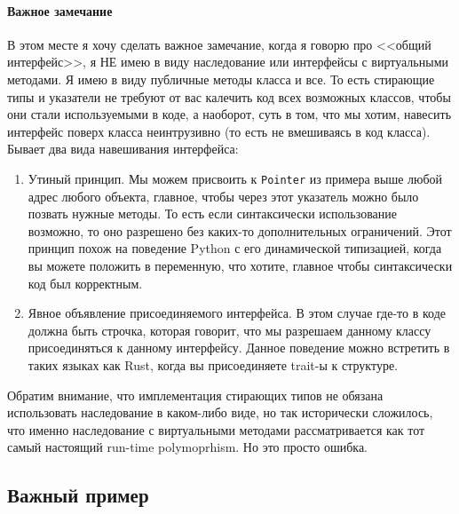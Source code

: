 \paragraph{Важное замечание}

В этом месте я хочу сделать важное замечание, когда я говорю про <<общий интерфейс>>, я НЕ имею в виду наследование или интерфейсы с виртуальными методами.
Я имею в виду публичные методы класса и все.
То есть стирающие типы и указатели не требуют от вас калечить код всех возможных классов, чтобы они стали используемыми в коде, а наоборот, суть в том, что мы хотим, навесить интерфейс поверх класса неинтрузивно (то есть не вмешиваясь в код класса).
Бывает два вида навешивания интерфейса:
\begin{enumerate}
\item Утиный принцип.
Мы можем присвоить к \texttt{Pointer} из примера выше любой адрес любого объекта, главное, чтобы через этот указатель можно было позвать нужные методы.
То есть если синтаксически использование возможно, то оно разрешено без каких-то дополнительных ограничений.
Этот принцип похож на поведение Python с его динамической типизацией, когда вы можете положить в переменную, что хотите, главное чтобы синтаксически код был корректным.

\item Явное объявление присоединяемого интерфейса.
В этом случае где-то в коде должна быть строчка, которая говорит, что мы разрешаем данному классу присоединяться к данному интерфейсу.
Данное поведение можно встретить в таких языках как Rust, когда вы присоединяете trait-ы к структуре.
\end{enumerate}
Обратим внимание, что имплементация стирающих типов не обязана использовать наследование в каком-либо виде, но так исторически сложилось, что именно наследование с виртуальными методами рассматривается как тот самый настоящий run-time polymoprhism.
Но это просто ошибка.

\subsection{Важный пример}

